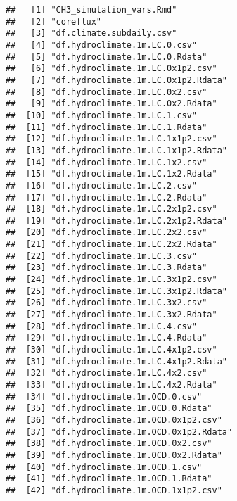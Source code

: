 \documentclass[
]{article}
\begin{document}
\begin{verbatim}
##   [1] "CH3_simulation_vars.Rmd"                          
##   [2] "coreflux"                                         
##   [3] "df.climate.subdaily.csv"                          
##   [4] "df.hydroclimate.1m.LC.0.csv"                      
##   [5] "df.hydroclimate.1m.LC.0.Rdata"                    
##   [6] "df.hydroclimate.1m.LC.0x1p2.csv"                  
##   [7] "df.hydroclimate.1m.LC.0x1p2.Rdata"                
##   [8] "df.hydroclimate.1m.LC.0x2.csv"                    
##   [9] "df.hydroclimate.1m.LC.0x2.Rdata"                  
##  [10] "df.hydroclimate.1m.LC.1.csv"                      
##  [11] "df.hydroclimate.1m.LC.1.Rdata"                    
##  [12] "df.hydroclimate.1m.LC.1x1p2.csv"                  
##  [13] "df.hydroclimate.1m.LC.1x1p2.Rdata"                
##  [14] "df.hydroclimate.1m.LC.1x2.csv"                    
##  [15] "df.hydroclimate.1m.LC.1x2.Rdata"                  
##  [16] "df.hydroclimate.1m.LC.2.csv"                      
##  [17] "df.hydroclimate.1m.LC.2.Rdata"                    
##  [18] "df.hydroclimate.1m.LC.2x1p2.csv"                  
##  [19] "df.hydroclimate.1m.LC.2x1p2.Rdata"                
##  [20] "df.hydroclimate.1m.LC.2x2.csv"                    
##  [21] "df.hydroclimate.1m.LC.2x2.Rdata"                  
##  [22] "df.hydroclimate.1m.LC.3.csv"                      
##  [23] "df.hydroclimate.1m.LC.3.Rdata"                    
##  [24] "df.hydroclimate.1m.LC.3x1p2.csv"                  
##  [25] "df.hydroclimate.1m.LC.3x1p2.Rdata"                
##  [26] "df.hydroclimate.1m.LC.3x2.csv"                    
##  [27] "df.hydroclimate.1m.LC.3x2.Rdata"                  
##  [28] "df.hydroclimate.1m.LC.4.csv"                      
##  [29] "df.hydroclimate.1m.LC.4.Rdata"                    
##  [30] "df.hydroclimate.1m.LC.4x1p2.csv"                  
##  [31] "df.hydroclimate.1m.LC.4x1p2.Rdata"                
##  [32] "df.hydroclimate.1m.LC.4x2.csv"                    
##  [33] "df.hydroclimate.1m.LC.4x2.Rdata"                  
##  [34] "df.hydroclimate.1m.OCD.0.csv"                     
##  [35] "df.hydroclimate.1m.OCD.0.Rdata"                   
##  [36] "df.hydroclimate.1m.OCD.0x1p2.csv"                 
##  [37] "df.hydroclimate.1m.OCD.0x1p2.Rdata"               
##  [38] "df.hydroclimate.1m.OCD.0x2.csv"                   
##  [39] "df.hydroclimate.1m.OCD.0x2.Rdata"                 
##  [40] "df.hydroclimate.1m.OCD.1.csv"                     
##  [41] "df.hydroclimate.1m.OCD.1.Rdata"                   
##  [42] "df.hydroclimate.1m.OCD.1x1p2.csv"                 

\end{verbatim}
\end{document}
